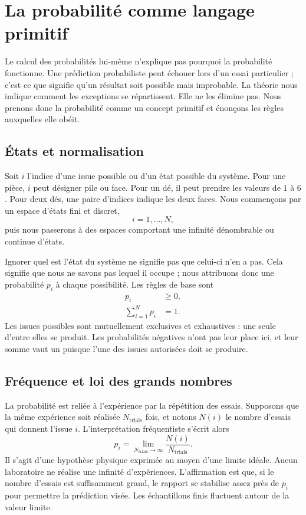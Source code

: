\section{La probabilité comme langage primitif}

Le calcul des probabilités lui-même n’explique pas pourquoi la probabilité fonctionne. Une prédiction probabiliste peut échouer lors d’un essai particulier ; c’est ce que signifie qu’un résultat soit possible mais improbable. La théorie nous indique comment les exceptions se répartissent. Elle ne les élimine pas. Nous prenons donc la probabilité comme un concept primitif et énonçons les règles auxquelles elle obéit.

\subsection{États et normalisation}

Soit \(i\) l’indice d’une issue possible ou d’un état possible du système. Pour une pièce, \(i\) peut désigner pile ou face. Pour un dé, il peut prendre les valeurs de \(1\) à \(6\). Pour deux dés, une paire d’indices indique les deux faces. Nous commençons par un espace d’états fini et discret,
\begin{equation}
 i=1,\ldots,N,
\end{equation}
puis nous passerons à des espaces comportant une infinité dénombrable ou continue d’états.

Ignorer quel est l’état du système ne signifie pas que celui-ci n’en a pas. Cela signifie que nous ne savons pas lequel il occupe ; nous attribuons donc une probabilité \(p_i\) à chaque possibilité. Les règles de base sont
\begin{align}
 p_i &\geq 0, \label{eq:sm1-prob-positive}\\
 \sum_{i=1}^{N}p_i &=1. \label{eq:sm1-prob-normalization}
\end{align}
Les issues possibles sont mutuellement exclusives et exhaustives : une seule d’entre elles se produit. Les probabilités négatives n’ont pas leur place ici, et leur somme vaut un puisque l’une des issues autorisées doit se produire.

\subsection{Fréquence et loi des grands nombres}

La probabilité est reliée à l’expérience par la répétition des essais. Supposons que la même expérience soit réalisée \(N_{\mathrm{trials}}\) fois, et notons \(N(i)\) le nombre d’essais qui donnent l’issue \(i\). L’interprétation fréquentiste s’écrit alors
\begin{equation}
 p_i=
 \lim_{N_{\mathrm{trials}}\to\infty}
 \frac{N(i)}{N_{\mathrm{trials}}}.
 \label{eq:sm1-frequency}
\end{equation}
Il s’agit d’une hypothèse physique exprimée au moyen d’une limite idéale. Aucun laboratoire ne réalise une infinité d’expériences. L’affirmation est que, si le nombre d’essais est suffisamment grand, le rapport se stabilise assez près de \(p_i\) pour permettre la prédiction visée. Les échantillons finis fluctuent autour de la valeur limite.

